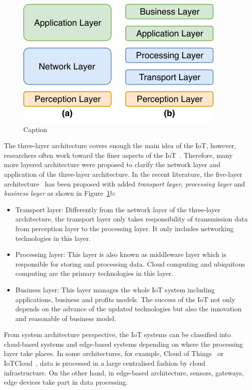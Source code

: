 \begin{figure}[ht!]
    \centering
    \includegraphics[scale=1.5]{Pictures/c2/2-2-IoT-architectures}
    \caption{Caption}
    \label{fig:2.3-iot-architecture}
\end{figure}


The three-layer architecture covers enough the main idea of the IoT, however, researchers often work toward the finer aspects of the IoT~\citep{Sethi:2017}.
Therefore, many more layered architecture were proposed to clarify the network layer and application of the three-layer architecture.
In the recent literature, the five-layer architecture~\citep{Wu:2010,Khan:2012} has been proposed with added \textit{transport layer}, \textit{processing layer} and \textit{business layer} as shown in Figure~\ref{fig:2.3-iot-architecture}b:
\begin{itemize}[noitemsep,nolistsep]
\item Transport layer: Differently from the network layer of the three-layer architecture, the transport layer only takes responsibility of transmission data from perception layer to the processing layer. It only includes networking technologies in this layer.

\item Processing layer: This layer is also known as middleware layer which is responsible for storing and processing data. Cloud computing and ubiquitous computing are the primary technologies in this layer.

\item Business layer: This layer manages the whole IoT system including applications, business and profits models. The success of the IoT not only depends on the advance of the updated technologies but also the innovation and reasonable of business model.

\end{itemize}

From system architecture perspective, the IoT systems can be classified into cloud-based systems and edge-based systems depending on where the processing layer take places.
In some architectures, for example, Cloud of Things~\citep{Jiehan:2013} or IoTCloud~\citep{Truong:2015}, data is processed in a large centralised fashion by cloud infrastructure.
On the other hand, in edge-based architecture, sensors, gateways, edge devices take part in data processing. 


